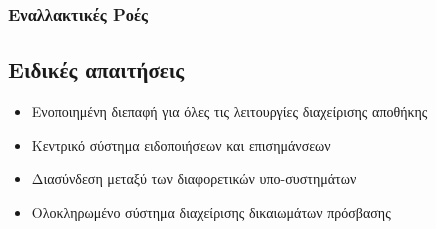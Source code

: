 \documentclass[12pt,a4paper,twoside]{book}
\begin{document}
\subsubsection{Εναλλακτικές Ροές}

\subsection{Ειδικές απαιτήσεις} %
\begin{itemize}
  \item Ενοποιημένη διεπαφή για όλες τις λειτουργίες διαχείρισης αποθήκης %
  \item Κεντρικό σύστημα ειδοποιήσεων και επισημάνσεων %
  \item Διασύνδεση μεταξύ των διαφορετικών υπο-συστημάτων %
  \item Ολοκληρωμένο σύστημα διαχείρισης δικαιωμάτων πρόσβασης %
\end{itemize}
\end{document}
